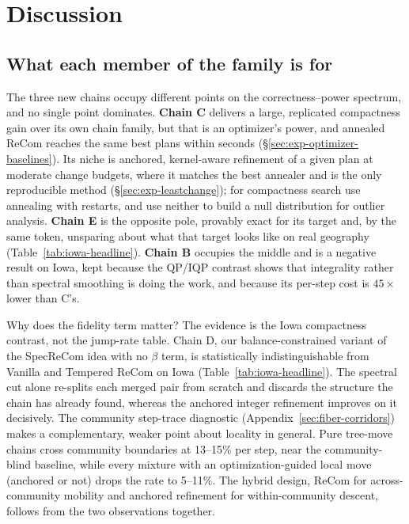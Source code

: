 \documentclass[11pt]{article}
\begin{document}
\section{Discussion}\label{sec:discussion}

\subsection{What each member of the family is for}\label{sec:disc-roles}

The three new chains occupy different points on the
correctness--power spectrum, and no single point dominates.
\textbf{Chain C} delivers a large, replicated compactness gain over
its own chain family, but that is an optimizer's power, and annealed
ReCom reaches the same best plans within seconds
(\S\ref{sec:exp-optimizer-baselines}). Its niche is anchored,
kernel-aware refinement of a given plan at moderate change budgets,
where it matches the best annealer and is the only reproducible
method (\S\ref{sec:exp-leastchange}); for compactness search use
annealing with restarts, and use neither to build a null distribution
for outlier analysis. \textbf{Chain E} is the opposite pole,
provably exact for its target and, by the same token, unsparing about
what that target looks like on real geography
(Table~\ref{tab:iowa-headline}). \textbf{Chain B} occupies the middle and is a
negative result on Iowa, kept because the QP/IQP contrast shows that
integrality rather than spectral smoothing is doing the work, and
because its per-step cost is $45\times$ lower than C's.

Why does the fidelity term matter? The evidence is the Iowa
compactness contrast, not the jump-rate table. Chain D, our
balance-constrained variant of the SpecReCom idea with no $\beta$
term, is statistically indistinguishable from Vanilla and Tempered
ReCom on Iowa (Table~\ref{tab:iowa-headline}). The spectral cut alone
re-splits each merged pair from scratch and discards the structure the
chain has already found, whereas the anchored integer refinement
improves on it decisively. The community step-trace diagnostic
(Appendix~\ref{sec:fiber-corridors}) makes a complementary, weaker point
about locality in general. Pure tree-move chains cross community
boundaries at 13--15\% per step, near the community-blind baseline,
while every mixture with an optimization-guided local move (anchored
or not) drops the rate to 5--11\%. The hybrid design, ReCom for
across-community mobility and anchored refinement for
within-community descent, follows from the two observations
together.
\end{document}
